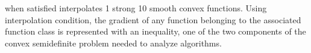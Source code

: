 when satisfied interpolates 1 strong 10 smooth convex functions. Using interpolation condition, the gradient of any function belonging to the associated function class is represented with an inequality, one of the two components of the convex semidefinite problem needed to analyze algorithms.
